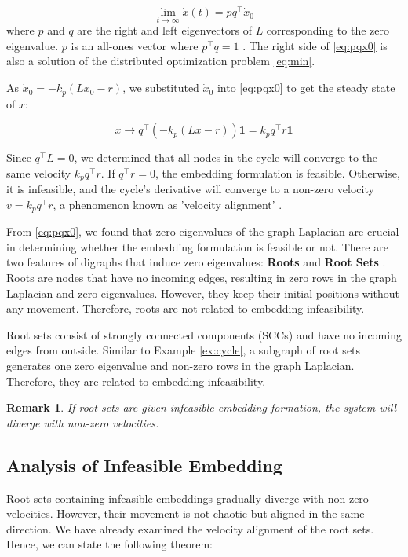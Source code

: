 \documentclass[letterpaper, 10 pt, conference]{ieeeconf}  %
\newtheorem{remark}{Remark}
\begin{document}
\begin{equation}\label{eq:pqx0}
    \lim_{t \to \infty} \dot{x}(t) = pq^\top \dot{x}_0
\end{equation}
\noindent where \( p \) and \( q \) are the right and left eigenvectors of \(L\) corresponding to the zero eigenvalue. \(p\) is an all-ones vector where \(p^\top q = 1\) \cite{olfati-saber_consensus_2007}. The right side of \eqref{eq:pqx0} is also a solution of the distributed optimization problem \eqref{eq:min}.

As \(\dot{x}_0 = -k_p(Lx_0 - r)\), we substituted \(\dot{x}_0\) into \eqref{eq:pqx0} to get the steady state of \(\dot{x}\):

\begin{equation}\label{eq:steady}
    \dot{x} \rightarrow    q^\top (-k_p (Lx -r))\mathbf{1}
    = k_p q^\top r \mathbf{1}
\end{equation}

\noindent Since \(q^\top L = 0\), we determined that all nodes in the cycle will converge to the same velocity \(k_p q^\top r\). If \(q^\top r = 0\), the embedding formulation is feasible. Otherwise, it is infeasible, and the cycle's derivative will converge to a non-zero velocity \(v = k_p q^\top r\), a phenomenon known as 'velocity alignment' \cite{dimarogonas_connection_2008}.

From \eqref{eq:pqx0}, we found that zero eigenvalues of the graph Laplacian are crucial in determining whether the embedding formulation is feasible or not. There are two features of digraphs that induce zero eigenvalues: \textbf{Roots} and \textbf{Root Sets} \cite{niezink_consensus_2011}. Roots are nodes that have no incoming edges, resulting in zero rows in the graph Laplacian and zero eigenvalues. However, they keep their initial positions without any movement. Therefore, roots are not related to embedding infeasibility.

Root sets consist of strongly connected components (SCCs) and have no incoming edges from outside. Similar to Example \ref{ex:cycle}, a subgraph of root sets generates one zero eigenvalue and non-zero rows in the graph Laplacian. Therefore, they are related to embedding infeasibility.

\begin{remark}
    If root sets are given infeasible embedding formation, the system will diverge with non-zero velocities.
\end{remark}

\subsection{Analysis of Infeasible Embedding}  
Root sets containing infeasible embeddings gradually diverge with non-zero velocities. However, their movement is not chaotic but aligned in the same direction. We have already examined the velocity alignment of the root sets. Hence, we can state the following theorem:
\end{document}
